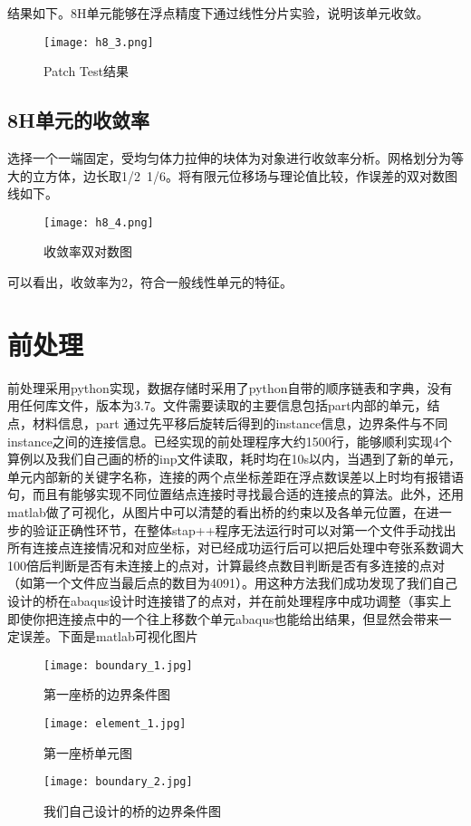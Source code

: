 \documentclass[forprint]{WHUBachelor}
\begin{document}
结果如下。8H单元能够在浮点精度下通过线性分片实验，说明该单元收敛。

\begin{figure}[H]
\centering  
\texttt{[image: h8\_3.png]} 
\caption{Patch Test结果} 
\label{f2.3} 
\end{figure}

\subsection{8H单元的收敛率}
选择一个一端固定，受均匀体力拉伸的块体为对象进行收敛率分析。网格划分为等大的立方体，边长取1/2~1/6。将有限元位移场与理论值比较，作误差的双对数图线如下。
\begin{figure}[H]
\centering  
\texttt{[image: h8\_4.png]} 
\caption{收敛率双对数图} 
\label{f2.4} 
\end{figure}

可以看出，收敛率为2，符合一般线性单元的特征。
\section{前处理}
前处理采用python实现，数据存储时采用了python自带的顺序链表和字典，没有用任何库文件，版本为3.7。文件需要读取的主要信息包括part内部的单元，结点，材料信息，part 通过先平移后旋转后得到的instance信息，边界条件与不同instance之间的连接信息。已经实现的前处理程序大约1500行，能够顺利实现4个算例以及我们自己画的桥的inp文件读取，耗时均在10s以内，当遇到了新的单元，单元内部新的关键字名称，连接的两个点坐标差距在浮点数误差以上时均有报错语句，而且有能够实现不同位置结点连接时寻找最合适的连接点的算法。此外，还用matlab做了可视化，从图片中可以清楚的看出桥的约束以及各单元位置，在进一步的验证正确性环节，在整体stap++程序无法运行时可以对第一个文件手动找出所有连接点连接情况和对应坐标，对已经成功运行后可以把后处理中夸张系数调大100倍后判断是否有未连接上的点对，计算最终点数目判断是否有多连接的点对（如第一个文件应当最后点的数目为4091）。用这种方法我们成功发现了我们自己设计的桥在abaqus设计时连接错了的点对，并在前处理程序中成功调整（事实上即使你把连接点中的一个往上移数个单元abaqus也能给出结果，但显然会带来一定误差。下面是matlab可视化图片
\begin{figure}[H]
\centering  
\texttt{[image: boundary\_1.jpg]} 
\caption{第一座桥的边界条件图} 
\label{f3.1} 
\end{figure}
\begin{figure}[H]
\centering  
\texttt{[image: element\_1.jpg]} 
\caption{第一座桥单元图} 
\label{f3.2} 
\end{figure}
\begin{figure}[H]
\centering  
\texttt{[image: boundary\_2.jpg]} 
\caption{我们自己设计的桥的边界条件图} 
\label{f3.3} 
\end{figure}
\end{document}
